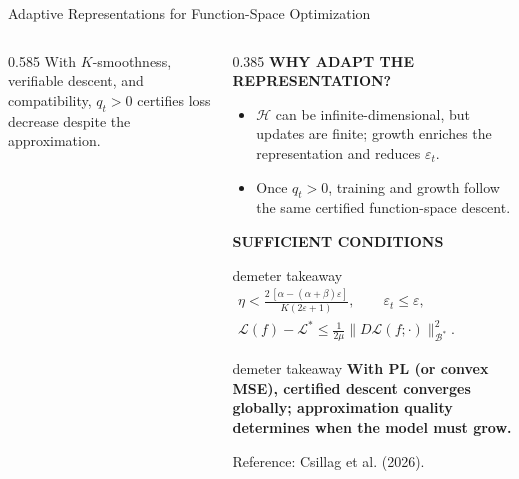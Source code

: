 \begin{frame}[t]{Adaptive Representations for Function-Space Optimization}
\begin{columns}[T,onlytextwidth]
\begin{column}{0.585\textwidth}
      \vspace{0.09cm}
      {\fontsize{7.35}{8.8}\selectfont
      With $K$-smoothness, verifiable descent, and compatibility, $q_t>0$
      certifies loss decrease despite the approximation.}
    \end{column}

    \begin{column}{0.385\textwidth}
      {\color{EnstaBlue}\bfseries\scriptsize WHY ADAPT THE REPRESENTATION?}
      \vspace{0.03cm}

      {\fontsize{7.35}{8.8}\selectfont
      \begin{itemize}
        \setlength{\itemsep}{0.08cm}
        \item $\mathcal H$ can be infinite-dimensional, but updates are
              finite; growth enriches the representation and reduces
              $\varepsilon_t$.
        \item Once $q_t>0$, training and growth follow the same certified
              function-space descent.
      \end{itemize}}

      \vspace{0.03cm}
      {\color{EnstaBlue}\bfseries\scriptsize SUFFICIENT CONDITIONS}
      \vspace{0.03cm}

      \begin{beamercolorbox}[rounded=true,sep=0.10cm,wd=\linewidth]{demeter takeaway}
        \centering
        \fontsize{6.6}{8.0}\selectfont
        \(\displaystyle
          \begin{gathered}
            \eta<\frac{2\,[\alpha-(\alpha+\beta)\varepsilon]}
                         {K(2\varepsilon+1)},\qquad \varepsilon_t\leq\varepsilon,\\[4pt]
            \mathcal L(f)-\mathcal L^*
            \leq \frac{1}{2\mu}
            \lVert D\mathcal L(f;\cdot)\rVert_{\mathcal B^*}^{2}.
          \end{gathered}
        \)
      \end{beamercolorbox}

      \vspace{0.09cm}
      \begin{beamercolorbox}[rounded=true,sep=0.10cm,wd=\linewidth]{demeter takeaway}
        {\fontsize{7.15}{8.5}\selectfont\bfseries\color{LisnNavy}
        With PL (or convex MSE), certified descent converges globally;
        approximation quality determines when the model must grow.}
      \end{beamercolorbox}

      \vspace{0.04cm}
      {\color{MutedText}\fontsize{6.2}{7.3}\selectfont
      Reference: Csillag et al. (2026).}
    \end{column}
  \end{columns}
\end{frame}
